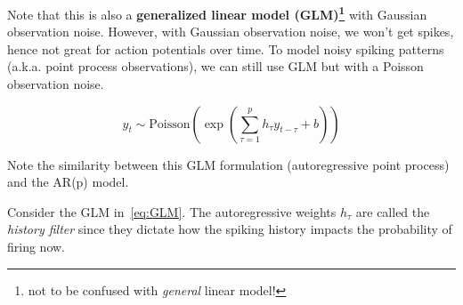\documentclass[a4paper,11pt]{exam}
\newcounter{homework}
\newcommand{\homework}{\stepcounter{homework}\textcolor{violet}{\textbf{Homework \thehomework:}~}}
\begin{document}
\begin{questions}

Note that this is also a \textbf{generalized linear model (GLM)\footnote{not to be confused with \emph{general} linear model!}} with Gaussian observation noise.
However, with Gaussian observation noise, we won't get spikes, hence not great for action potentials over time.
To model noisy spiking patterns (a.k.a. point process observations), we can still use GLM but with a Poisson observation noise.
\begin{tcolorbox}[colback=red!5!white,colframe=red!50!black,title=Autoregressive Point Process (a.k.a. Poisson-GLM)]
\noindent
\begin{equation}\label{eq:GLM}
    y_t \sim \text{Poisson}\left(\exp\left( \sum_{\tau=1}^p h_\tau y_{t-\tau} + b\right)\right)
\end{equation}
\end{tcolorbox}
Note the similarity between this GLM formulation (autoregressive point process) and the AR(p) model.

\question Consider the GLM in~\eqref{eq:GLM}.
The autoregressive weights $h_\tau$ are called the \emph{history filter} since they dictate how the spiking history impacts the probability of firing now.
\end{questions}
\end{document}
